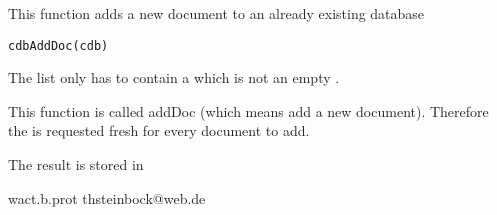\begin{Description}\relax
This function adds a new document to an already existing database
\end{Description}
\begin{Usage}
\begin{verbatim}
cdbAddDoc(cdb)
\end{verbatim}
\end{Usage}
\begin{Arguments}
\begin{ldescription}
\item[\code{cdb}] The list  only has to contain a
 which is not an empty .

\end{ldescription}
\end{Arguments}
\begin{Details}\relax
This function is called addDoc (which means add a new
document). Therefore the
 is requested fresh for every document to add.
\end{Details}
\begin{Value}
\begin{ldescription}
\item[\code{cdb}] The result is stored in 

\end{ldescription}
\end{Value}
\begin{Author}\relax
wact.b.prot
thsteinbock@web.de
\end{Author}
\begin{SeeAlso}\relax
{}
\end{SeeAlso}

